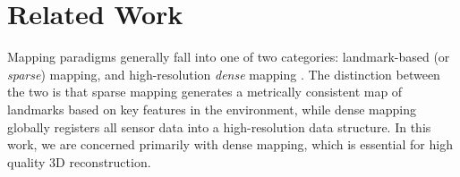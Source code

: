 \documentclass[10pt,twocolumn,letterpaper]{article}
\begin{document}
\section{Related Work}
Mapping paradigms generally fall into one of two categories:
landmark-based (or \emph{sparse}) mapping, and high-resolution \emph{dense}
mapping \cite{FastSlam} . The distinction between the two is that sparse mapping
generates a metrically consistent map of landmarks based on key features in the
environment, while dense mapping globally registers all sensor data into a
high-resolution data structure. In this work, we are concerned primarily with
dense mapping, which is essential for high quality 3D reconstruction.
\end{document}
